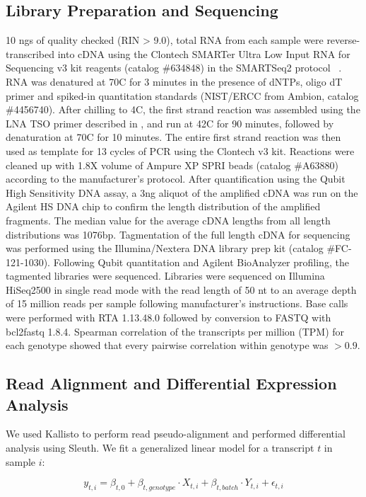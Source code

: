 \documentclass[9pt,twocolumn,twoside]{pnas-new}
\begin{document}
{\subsection*{Library Preparation and Sequencing}
10 ngs of quality checked (RIN > 9.0), total RNA from each sample were
reverse-transcribed into cDNA using the Clontech SMARTer Ultra Low Input RNA for
Sequencing v3 kit reagents (catalog \#634848) in the SMARTSeq2 protocol
~\cite{Picelli2014}.  RNA was denatured at 70C for 3 minutes
in the presence of dNTPs, oligo dT primer and spiked-in quantitation standards
(NIST/ERCC from Ambion, catalog \#4456740).  After chilling to 4C, the first
strand reaction was assembled using the LNA TSO primer described in \citep{Picelli2014},
and run at 42C for 90 minutes, followed by denaturation at 70C for 10
minutes.  The entire first strand reaction was then used as template for 13
cycles of PCR using the Clontech v3 kit.  Reactions were cleaned up with 1.8X
volume of Ampure XP SPRI beads (catalog \#A63880) according to the manufacturer’s
protocol.  After quantification using the Qubit High Sensitivity DNA assay, a 3ng
aliquot of the amplified cDNA was run on the Agilent HS DNA chip to confirm the
length distribution of the amplified fragments.  The median value for the
average cDNA lengths from all length distributions was 1076bp.  Tagmentation of
the full length cDNA for sequencing was performed using the Illumina/Nextera DNA
library prep kit (catalog \#FC-121-1030).  Following Qubit quantitation and
Agilent BioAnalyzer profiling, the tagmented libraries were sequenced.
Libraries were sequenced on Illumina HiSeq2500 in single read mode with the read
length of 50 nt to an average depth of 15 million reads per sample following
manufacturer's instructions. Base calls were performed with RTA 1.13.48.0
followed by conversion to FASTQ with bcl2fastq 1.8.4. Spearman correlation of
the transcripts per million (TPM) for each genotype showed that every pairwise
correlation within genotype was $>0.9$.

\subsection*{Read Alignment and Differential Expression Analysis}
We used Kallisto to perform read pseudo-alignment and performed differential
analysis using Sleuth. We fit a generalized linear model for a transcript $t$ in
sample $i$:

\begin{equation}
  y_{t,i} = \beta_{t, 0} + \beta_{t, genotype}\cdot{}X_{t, i} +
  \beta_{t, batch}\cdot{}Y_{t, i} + \epsilon_{t, i}
\end{equation}

}
\end{document}
